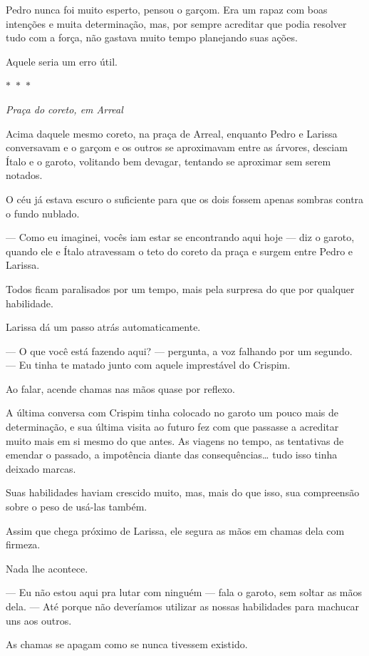 Pedro nunca foi muito esperto, pensou o garçom.  
Era um rapaz com boas intenções e muita determinação, mas, por sempre acreditar que podia resolver tudo com a força, não gastava muito tempo planejando suas ações.

Aquele seria um erro útil.

\begin{center}
$\ast$~$\ast$~$\ast$

\textit{Praça do coreto, em Arreal}
\end{center}

Acima daquele mesmo coreto, na praça de Arreal, enquanto Pedro e Larissa conversavam e o garçom e os outros se aproximavam entre as árvores, desciam Ítalo e o garoto, volitando bem devagar, tentando se aproximar sem serem notados.

O céu já estava escuro o suficiente para que os dois fossem apenas sombras contra o fundo nublado.

— Como eu imaginei, vocês iam estar se encontrando aqui hoje — diz o garoto, quando ele e Ítalo atravessam o teto do coreto da praça e surgem entre Pedro e Larissa.

Todos ficam paralisados por um tempo, mais pela surpresa do que por qualquer habilidade.

Larissa dá um passo atrás automaticamente.

— O que você está fazendo aqui? — pergunta, a voz falhando por um segundo. — Eu tinha te matado junto com aquele imprestável do Crispim.

Ao falar, acende chamas nas mãos quase por reflexo.

A última conversa com Crispim tinha colocado no garoto um pouco mais de determinação, e sua última visita ao futuro fez com que passasse a acreditar muito mais em si mesmo do que antes. As viagens no tempo, as tentativas de emendar o passado, a impotência diante das consequências… tudo isso tinha deixado marcas.

Suas habilidades haviam crescido muito, mas, mais do que isso, sua compreensão sobre o peso de usá-las também.

Assim que chega próximo de Larissa, ele segura as mãos em chamas dela com firmeza.

Nada lhe acontece.

— Eu não estou aqui pra lutar com ninguém — fala o garoto, sem soltar as mãos dela. — Até porque não deveríamos utilizar as nossas habilidades para machucar uns aos outros.

As chamas se apagam como se nunca tivessem existido.

